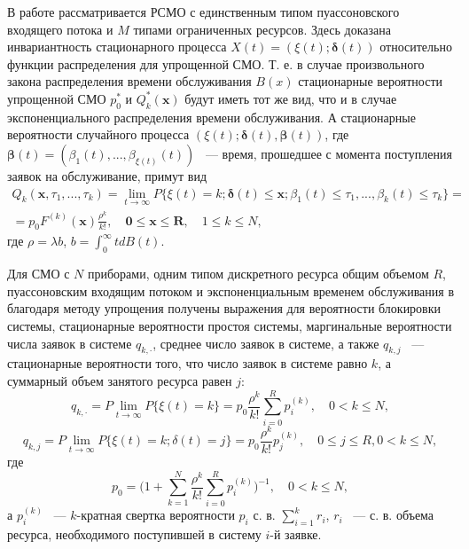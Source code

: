 \documentclass[a4paper,12pt]{article}
\begin{document}
В работе \cite{Sopin_16_2018} рассматривается РСМО с единственным типом пуассоновского входящего потока и $M$ типами ограниченных ресурсов.
Здесь доказана инвариантность стационарного процесса $X(t)=(\xi(t);\boldsymbol{\delta}(t))$ относительно функции распределения для упрощенной СМО. Т. е. в случае произвольного закона распределения времени обслуживания $B(x)$ стационарные вероятности упрощенной СМО $p^{*}_0$ и $Q^{*}_k(\mathbf{x})$ будут иметь тот же вид, что и в случае экспоненциального распределения времени обслуживания. А стационарные вероятности случайного процесса $(\xi(t);\boldsymbol{\delta}(t), \boldsymbol{\beta}(t))$, где $\boldsymbol{\beta}(t)=(\beta_1(t),...,\beta_{\xi(t)}(t))$ ~--- время, прошедшее с момента поступления заявок на обслуживание, примут вид
\begin{equation}
\begin{gathered}
Q_k(\mathbf{x},\tau_1,...,\tau_k)=\lim_{t\rightarrow \infty} P \{ \xi(t)=k;\boldsymbol{\delta}(t)\leq \mathbf{x}; \beta_1(t) \leq \tau_1,...,\beta_k(t) \leq \tau_k  \}=\\
=p_0 F^{(k)}(\mathbf{x})\frac{\rho^{k}}{k!}, \quad
\mathbf{0} \leq \mathbf{x} \leq \mathbf{R}, \quad 1\leq k \leq N,
\end{gathered}
\end{equation}
где $\rho=\lambda b$, $b=\int_{0}^{\infty}tdB(t)$.

Для СМО с $N$ приборами, одним типом дискретного ресурса общим объемом $R$, пуассоновским входящим потоком и экспоненциальным временем обслуживания в \cite{Sopin_4_2015,Sopin_5_2015} благодаря методу упрощения получены выражения для вероятности блокировки системы, стационарные вероятности простоя системы, маргинальные вероятности числа заявок в системе $q_{k,\cdot}$, среднее число заявок в системе, а также $q_{k,j}$ ~--– стационарные вероятности того, что число заявок в системе равно $k$, а суммарный объем занятого ресурса равен $j$:
\begin{equation}
q_{k,\cdot}=P\lim_{t\rightarrow \infty}P\{ \xi(t)=k \}=p_0\frac{\rho^k}{k!}\sum_{i=0}^{R}p_i^{(k)},
\quad 0<k\leq N,
\end{equation}
\begin{equation}
q_{k,j}=P\lim_{t\rightarrow \infty}P \{ \xi(t)=k; \delta(t)=j\}=p_0\frac{\rho^k}{k!}p_j^{(k)},
\quad 0\leq j\leq R, 0<k\leq N,
\end{equation}
где
\begin{equation}
p_0=\bigg( 1+\sum_{k=1}^{N}\frac{\rho^k}{k!}\sum_{i=0}^{R}p_i^{(k)} \bigg )^{-1},
\quad 0<k\leq N,
\end{equation}
а $p^{(k)}_i$ ~--- $k$-кратная свертка вероятности $p_i$ с. в. $\sum_{i=1}^{k}r_i$, $r_i$ ~--- с. в. объема ресурса, необходимого поступившей в систему $i$-й заявке.
\end{document}

